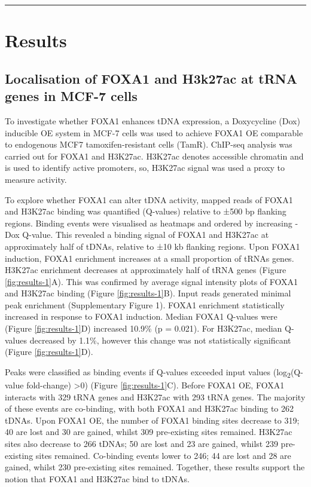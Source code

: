\documentclass[
  12pt,
]{article}
\begin{document}
\begin{center}\rule{0.5\linewidth}{0.5pt}\end{center}

\hypertarget{results}{%
\section{Results}\label{results}}

\hypertarget{localisation-of-foxa1-and-h3k27ac-at-trna-genes-in-mcf-7-cells}{%
\subsection{Localisation of FOXA1 and H3k27ac at tRNA genes in MCF-7 cells}\label{localisation-of-foxa1-and-h3k27ac-at-trna-genes-in-mcf-7-cells}}

To investigate whether FOXA1 enhances tDNA expression, a Doxycycline (Dox) inducible OE system in MCF-7 cells was used to achieve FOXA1 OE comparable to endogenous MCF7 tamoxifen-resistant cells (TamR).
ChIP-seq analysis was carried out for FOXA1 and H3K27ac.
H3K27ac denotes accessible chromatin and is used to identify active promoters, so, H3K27ac signal was used a proxy to measure activity.

To explore whether FOXA1 can alter tDNA activity, mapped reads of FOXA1 and H3K27ac binding was quantified (Q-values) relative to ±500 bp flanking regions.
Binding events were visualised as heatmaps and ordered by increasing -Dox Q-value.
This revealed a binding signal of FOXA1 and H3K27ac at approximately half of tDNAs, relative to ±10 kb flanking regions.
Upon FOXA1 induction, FOXA1 enrichment increases at a small proportion of tRNAs genes.
H3K27ac enrichment decreases at approximately half of tRNA genes (Figure \ref{fig:results-1}A).
This was confirmed by average signal intensity plots of FOXA1 and H3K27ac binding (Figure \ref{fig:results-1}B).
Input reads generated minimal peak enrichment (Supplementary Figure 1).
FOXA1 enrichment statistically increased in response to FOXA1 induction.
Median FOXA1 Q-values were (Figure \ref{fig:results-1}D) increased 10.9\% (p = 0.021).
For H3K27ac, median Q-values decreased by 1.1\%, however this change was not statistically significant (Figure \ref{fig:results-1}D).

Peaks were classified as binding events if Q-values exceeded input values (log\textsubscript{2}(Q-value fold-change) \textgreater0) (Figure \ref{fig:results-1}C).
Before FOXA1 OE, FOXA1 interacts with 329 tRNA genes and H3K27ac with 293 tRNA genes.
The majority of these events are co-binding, with both FOXA1 and H3K27ac binding to 262 tDNAs.
Upon FOXA1 OE, the number of FOXA1 binding sites decrease to 319; 40 are lost and 30 are gained, whilst 309 pre-existing sites remained.
H3K27ac sites also decrease to 266 tDNAs; 50 are lost and 23 are gained, whilst 239 pre-existing sites remained.
Co-binding events lower to 246; 44 are lost and 28 are gained, whilst 230 pre-existing sites remained.
Together, these results support the notion that FOXA1 and H3K27ac bind to tDNAs.
\end{document}
